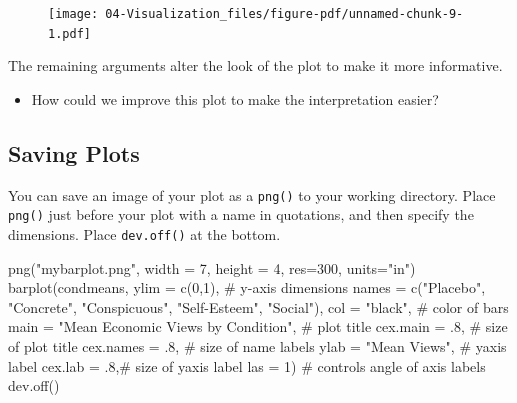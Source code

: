 \documentclass[
  letterpaper,
  DIV=11,
  numbers=noendperiod]{scrreprt}
\newenvironment{Shaded}{\begin{snugshade}}{\end{snugshade}}
\newcommand{\AttributeTok}[1]{\textcolor[rgb]{0.40,0.45,0.13}{#1}}
\newcommand{\CommentTok}[1]{\textcolor[rgb]{0.37,0.37,0.37}{#1}}
\newcommand{\DecValTok}[1]{\textcolor[rgb]{0.68,0.00,0.00}{#1}}
\newcommand{\FunctionTok}[1]{\textcolor[rgb]{0.28,0.35,0.67}{#1}}
\newcommand{\NormalTok}[1]{\textcolor[rgb]{0.00,0.23,0.31}{#1}}
\newcommand{\StringTok}[1]{\textcolor[rgb]{0.13,0.47,0.30}{#1}}
\providecommand{\tightlist}{%
  \setlength{\itemsep}{0pt}\setlength{\parskip}{0pt}}\usepackage{longtable,booktabs,array}
\begin{document}
\begin{figure}[H]

{\centering \texttt{[image: 04-Visualization\_files/figure-pdf/unnamed-chunk-9-1.pdf]}

}

\end{figure}

The remaining arguments alter the look of the plot to make it more
informative.

\begin{itemize}
\tightlist
\item
  How could we improve this plot to make the interpretation easier?
\end{itemize}

\hypertarget{saving-plots}{%
\subsection{Saving Plots}\label{saving-plots}}

You can save an image of your plot as a \texttt{png()} to your working
directory. Place \texttt{png()} just before your plot with a name in
quotations, and then specify the dimensions. Place \texttt{dev.off()} at
the bottom.

\begin{Shaded}
\begin{Highlighting}[]
\FunctionTok{png}\NormalTok{(}\StringTok{"mybarplot.png"}\NormalTok{, }\AttributeTok{width =} \DecValTok{7}\NormalTok{, }\AttributeTok{height =} \DecValTok{4}\NormalTok{, }\AttributeTok{res=}\DecValTok{300}\NormalTok{, }\AttributeTok{units=}\StringTok{"in"}\NormalTok{)}
\FunctionTok{barplot}\NormalTok{(condmeans,}
        \AttributeTok{ylim =}  \FunctionTok{c}\NormalTok{(}\DecValTok{0}\NormalTok{,}\DecValTok{1}\NormalTok{), }\CommentTok{\# y{-}axis dimensions}
        \AttributeTok{names =} \FunctionTok{c}\NormalTok{(}\StringTok{"Placebo"}\NormalTok{, }\StringTok{"Concrete"}\NormalTok{, }\StringTok{"Conspicuous"}\NormalTok{, }
                  \StringTok{"Self{-}Esteem"}\NormalTok{, }\StringTok{"Social"}\NormalTok{),}
        \AttributeTok{col =} \StringTok{"black"}\NormalTok{, }\CommentTok{\# color of bars}
        \AttributeTok{main =} \StringTok{"Mean Economic Views by Condition"}\NormalTok{, }\CommentTok{\# plot title}
        \AttributeTok{cex.main =}\NormalTok{ .}\DecValTok{8}\NormalTok{, }\CommentTok{\# size of plot title}
        \AttributeTok{cex.names =}\NormalTok{ .}\DecValTok{8}\NormalTok{, }\CommentTok{\# size of name labels}
        \AttributeTok{ylab =} \StringTok{"Mean Views"}\NormalTok{, }\CommentTok{\# yaxis label}
        \AttributeTok{cex.lab =}\NormalTok{ .}\DecValTok{8}\NormalTok{,}\CommentTok{\# size of yaxis label}
        \AttributeTok{las =} \DecValTok{1}\NormalTok{) }\CommentTok{\# controls angle of axis labels}
\FunctionTok{dev.off}\NormalTok{()}
\end{Highlighting}
\end{Shaded}
\end{document}
